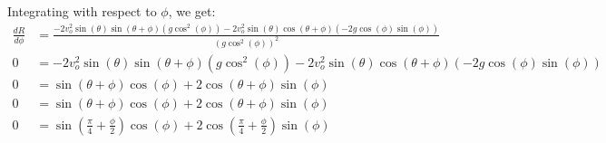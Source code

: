 \documentclass{article}
\begin{document}
Integrating with respect to $\phi$, we get:
\begin{equation}
    \begin{aligned}
        \frac{dR}{d\phi} & = \frac{-2v_o^2\sin(\theta)\sin(\theta + \phi)(g\cos^2(\phi)) - 2v_o^2\sin(\theta)\cos(\theta + \phi)(-2g\cos(\phi)\sin(\phi))}{(g\cos^2(\phi))^2} \\
        0                & = -2v_o^2\sin(\theta)\sin(\theta + \phi)(g\cos^2(\phi)) - 2v_o^2\sin(\theta)\cos(\theta + \phi)(-2g\cos(\phi)\sin(\phi))                           \\
        0                & = \sin(\theta + \phi)\cos(\phi) + 2\cos(\theta + \phi)\sin(\phi)                                                                                   \\
        0                & = \sin(\theta + \phi)\cos(\phi) + 2\cos(\theta + \phi)\sin(\phi)                                                                                   \\
        0                & = \sin(\frac{\pi}{4} + \frac{\phi}{2})\cos(\phi) + 2\cos(\frac{\pi}{4} + \frac{\phi}{2})\sin(\phi)                                                 \\
    \end{aligned}
\end{equation}
\end{document}
